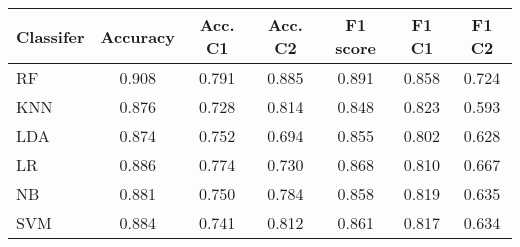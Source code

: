 \begin{tabular}{l|c|c|c|c|c|c}
\toprule
Classifer &  Accuracy &  Acc. C1 &  Acc. C2 &  F1 score &  F1 C1 &  F1 C2 \\
\midrule
       RF &     0.908 &    0.791 &    0.885 &     0.891 &  0.858 &  0.724 \\
      KNN &     0.876 &    0.728 &    0.814 &     0.848 &  0.823 &  0.593 \\
      LDA &     0.874 &    0.752 &    0.694 &     0.855 &  0.802 &  0.628 \\
       LR &     0.886 &    0.774 &    0.730 &     0.868 &  0.810 &  0.667 \\
       NB &     0.881 &    0.750 &    0.784 &     0.858 &  0.819 &  0.635 \\
      SVM &     0.884 &    0.741 &    0.812 &     0.861 &  0.817 &  0.634 \\
\bottomrule
\end{tabular}

